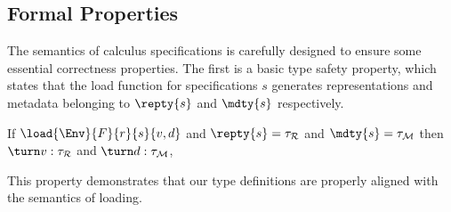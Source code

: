 \subsection{Formal Properties}

The semantics of \forest{} calculus specifications is carefully
designed to ensure some essential correctness properties. The first is
a basic type safety property, which states that the load function for
specifications $s$ generates representations and metadata belonging to
$\repty{s}$ and $\mdty{s}$ respectively.
%
\begin{proposition}
  If $\load{\Env}{F}{r}{s}{v,d}$ and $\repty{s} = \tau_{\mathcal{R}}$
  and $\mdty{s} = \tau_{\mathcal{M}}$ then $\turn v :
  \tau_{\mathcal{R}}$ and $\turn d : \tau_{\mathcal{M}}$,
\end{proposition}
%
This property demonstrates that our type definitions are properly
aligned with the semantics of loading.  

